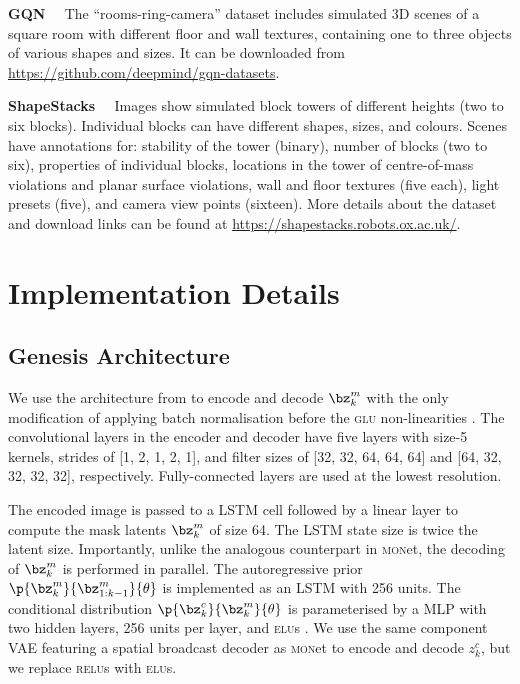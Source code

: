 \documentclass{article}
\begin{document}
\textbf{GQN \citep{eslami2018neural}}\ \
The ``rooms-ring-camera'' dataset includes simulated 3D scenes of a square room with different floor and wall textures, containing one to three objects of various shapes and sizes.
It can be downloaded from \url{https://github.com/deepmind/gqn-datasets}.

\textbf{ShapeStacks \citep{groth2018shapestacks}}\ \
Images show simulated block towers of different heights (two to six blocks).
Individual blocks can have different shapes, sizes, and colours.
Scenes have annotations for: stability of the tower (binary), number of blocks (two to six), properties of individual blocks, locations in the tower of centre-of-mass violations and planar surface violations, wall and floor textures (five each), light presets (five), and camera view points (sixteen).
More details about the dataset and download links can be found at \url{https://shapestacks.robots.ox.ac.uk/}.




\section{Implementation Details}
\label{app:implementation}


\subsection{Genesis Architecture}
\label{app:genesis_architecture}

We use the architecture from \citet{berg2018sylvester} to encode and decode $\bz^m_{k}$ with the only modification of applying batch normalisation \citep{ioffe2015batch} before the \textsc{glu} non-linearities \citep{dauphin2017language}.
The convolutional layers in the encoder and decoder have five layers with size-5 kernels, strides of [1, 2, 1, 2, 1], and filter sizes of [32, 32, 64, 64, 64] and [64, 32, 32, 32, 32], respectively.
Fully-connected layers are used at the lowest resolution.

The encoded image is passed to a \gls{LSTM} cell \citep{hochreiter1997long} followed by a linear layer to compute the mask latents $\bz^m_{k}$ of size 64.
The \gls{LSTM} state size is twice the latent size.
Importantly, unlike the analogous counterpart in \textsc{mon}et, the decoding of $\bz^m_{k}$ is performed in parallel.
The autoregressive prior $\p{\bz^m_k}{\bz^m_{1:k-1}}{\theta}$ is implemented as an \gls{LSTM} with 256 units.
The conditional distribution $\p{\bz^c_k}{\bz^m_k}{\theta}$ is parameterised by a \gls{MLP} with two hidden layers, 256 units per layer, and \textsc{elu}s \citep{clevert2015fast}.
We use the same component \gls{VAE} featuring a spatial broadcast decoder as \textsc{mon}et to encode and decode $z^c_k$, but we replace \textsc{relu}s \citep{glorot2011deep} with \textsc{elu}s.
\end{document}
